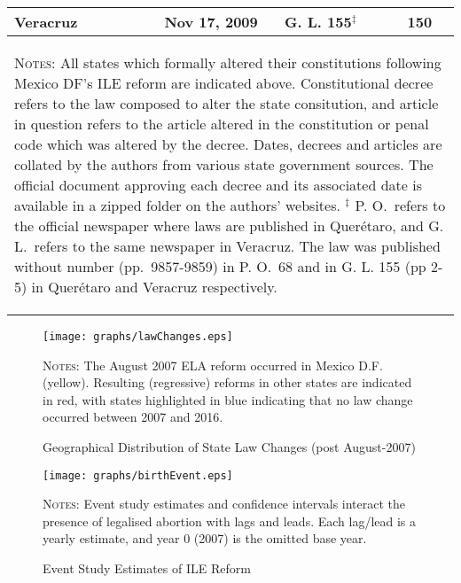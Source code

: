 \documentclass[a4paper,11pt]{article}
\begin{document}
\begin{spacing}{1.5}
\begin{table}[htpb!]
\begin{center}
\begin{tabular}{lclc}
      Veracruz         &       Nov 17, 2009  & G. L. 155$^\ddagger$  & 150 \\  \bottomrule
      \multicolumn{4}{p{10.5cm}}{\begin{footnotesize} \textsc{Notes:} All states which
          formally altered their constitutions following Mexico DF's ILE reform are indicated
          above.  Constitutional decree refers to the law composed to alter the state consitution,
          and article in question refers to the article altered in the constitution or penal code
          which was altered by the decree.  Dates, decrees and articles are collated by the authors
          from various state government sources.  The official document approving each decree and
          its associated date is available in a zipped folder on the authors' websites.
          \newline $^\ddagger$ P. O.\ refers to the official newspaper where laws are published in Quer\'etaro, and G. L.\ refers to the same newspaper in Veracruz.  The
          law was published without number (pp.\ 9857-9859) in P. O.\ 68 and in G. L. 155 (pp 2-5) in Quer\'etaro and Veracruz respectively.
      \end{footnotesize}}
    \end{tabular}
  \end{center}
\end{table}


\begin{landscape}
  \begin{figure}
    \begin{center}
      \caption{Geographical Distribution of State Law Changes (post August-2007)}
      \texttt{[image: graphs/lawChanges.eps]}
      \label{fig:entropyBirth}
    \end{center}
    \textsc{Notes:} The August 2007 ELA reform occurred in Mexico D.F. (yellow).  Resulting (regressive) reforms in other states are indicated in red, with states highlighted in blue indicating that no law change occurred between 2007 and 2016.
  \end{figure}
\end{landscape}

\clearpage



\clearpage

\begin{figure}[htpb!]
  \begin{center}
    \caption{Event Study Estimates of ILE Reform}
    \texttt{[image: graphs/birthEvent.eps]}
    \label{fig:eventBirth}
  \end{center}
  \textsc{Notes:} Event study estimates and confidence intervals interact the presence of
  legalised abortion with lags and leads.  Each lag/lead is a yearly estimate, and year 0
  (2007) is the omitted base year.
\end{figure}





\end{spacing}
\end{document}
